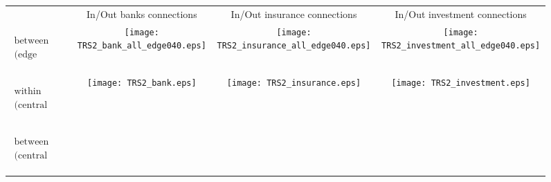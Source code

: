 \documentclass[12pt,a4paper]{article}
\theoremstyle{custom}
\begin{document}
\begin{figure}[t!h]
\centering
\captionsetup{width=0.95\linewidth}
\setlength{\abovecaptionskip}{1pt}
\begin{tabular}{c c c c}
 & {\footnotesize In/Out banks connections} & {\footnotesize In/Out insurance connections} & {\footnotesize In/Out investment connections} \\[4pt]
\begin{rotate}{90} \hspace*{40pt} {\large $\substack{\text{between groups}\\ \text{(edge threshold)}}$} \end{rotate} & 
\texttt{[image: TRS2\_bank\_all\_edge040.eps]} &
\texttt{[image: TRS2\_insurance\_all\_edge040.eps]} & 
\texttt{[image: TRS2\_investment\_all\_edge040.eps]} \\
\begin{rotate}{90} \hspace*{5pt} {\large $\substack{\text{within groups}\\ \text{(central institution)}}$} \end{rotate} & 
\texttt{[image: TRS2\_bank.eps]} &
\texttt{[image: TRS2\_insurance.eps]} & 
\texttt{[image: TRS2\_investment.eps]} \\
\begin{rotate}{90} \hspace*{30pt} {\large $\substack{\text{between groups}\\ \text{(central institution)}}$} \end{rotate} &

\end{tabular}
\end{figure}
\end{document}
